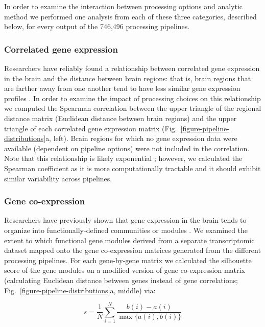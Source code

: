 \documentclass[12pt,aps,pra,reprint,showkeys]{revtex4-1}
\begin{document}
In order to examine the interaction between processing options and analytic method we performed one analysis from each of these three categories, described below, for every output of the 746,496 processing pipelines.

\subsubsection*{Correlated gene expression}

Researchers have reliably found a relationship between correlated gene expression in the brain and the distance between brain regions: that is, brain regions that are farther away from one another tend to have less similar gene expression profiles \citep{richiardi2015science, richiardi2017biorxiv, krienen2016pnas, vertes2016philtrans, arnatkeviciute2019neuroimage}.
In order to examine the impact of processing choices on this relationship we computed the Spearman correlation between the upper triangle of the regional distance matrix (Euclidean distance between brain regions) and the upper triangle of each correlated gene expression matrix (Fig.~\ref{figure-pipeline-distributions}a, left).
Brain regions for which no gene expression data were available (dependent on pipeline options) were not included in the correlation.
Note that this relationship is likely exponential \citep{arnatkeviciute2019neuroimage}; however, we calculated the Spearman coefficient as it is more computationally tractable and it should exhibit similar variability across pipelines.

\subsubsection*{Gene co-expression}

Researchers have previously shown that gene expression in the brain tends to organize into functionally-defined communities or modules \citep{oldham2008natneuro, hawrylycz2012nature}.
We examined the extent to which functional gene modules derived from a separate transcriptomic dataset \citep{oldham2008natneuro} mapped onto the gene co-expression matrices generated from the different processing pipelines.
For each gene-by-gene matrix we calculated the silhouette score \citep{rousseeuw1987silhouette} of the gene modules on a modified version of gene co-expression matrix (calculating Euclidean distance between genes instead of gene correlations; Fig.~\ref{figure-pipeline-distributions}a, middle) via:

\begin{equation*}
  s = \frac{1}{N} \sum_{i=1}^{N} \frac{b(i)-a(i)}{\max\{a(i),b(i)\}}
\end{equation*}
\end{document}
